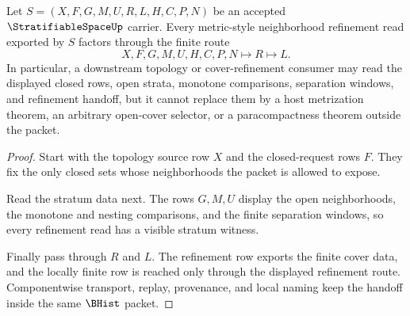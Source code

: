 \begin{theorem}
\label{thm:stratifiable-space-metric-topology-refinement-handoff}
Let $S=(X,F,G,M,U,R,L,H,C,P,N)$ be an accepted $\StratifiableSpaceUp$ carrier. Every metric-style neighborhood refinement read exported by $S$ factors through the finite route
$$
X,F,G,M,U,H,C,P,N \longmapsto R \longmapsto L .
$$
In particular, a downstream topology or cover-refinement consumer may read the displayed closed rows, open strata, monotone comparisons, separation windows, and refinement handoff, but it cannot replace them by a host metrization theorem, an arbitrary open-cover selector, or a paracompactness theorem outside the packet.
\end{theorem}
\begin{proof}
Start with the topology source row $X$ and the closed-request rows $F$. They fix the only closed sets whose neighborhoods the packet is allowed to expose.

Read the stratum data next. The rows $G,M,U$ display the open neighborhoods, the monotone and nesting comparisons, and the finite separation windows, so every refinement read has a visible stratum witness.

Finally pass through $R$ and $L$. The refinement row exports the finite cover data, and the locally finite row is reached only through the displayed refinement route. Componentwise transport, replay, provenance, and local naming keep the handoff inside the same $\BHist$ packet.
\end{proof}


\begin{closurestatus}{\StratifiableSpaceUp}
  \theoryclosure{\seedClosure}
  \formalstatus{\unformalizedV}
\end{closurestatus}
